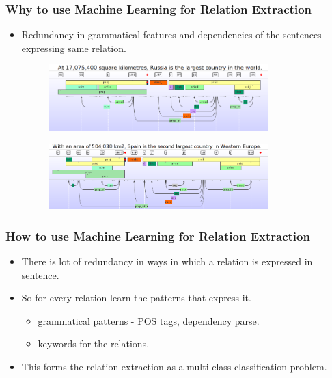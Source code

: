 \documentclass{beamer}
\begin{document}
\begin{frame}
 \frametitle{Why to use Machine Learning for Relation Extraction}
 
 \begin{itemize}
  \item Redundancy in grammatical features and dependencies of the sentences expressing same relation. \pause
     \begin{figure}
    \centering
    \includegraphics[width = 0.8\textwidth]{images/ex_4}
  \end{figure} \pause
  
   \begin{figure}
    \centering
    \includegraphics[width = 0.8\textwidth]{images/ex_5}
  \end{figure}
  
  
 \end{itemize}

\end{frame}

\begin{frame}
\frametitle{How to use Machine Learning for Relation Extraction}
\begin{itemize}
  \item There is lot of redundancy in ways in which a relation is expressed in sentence. \pause
  \item So for every relation learn the patterns that express it. \pause
    \begin{itemize}
      \item grammatical patterns - POS tags, dependency parse. \pause
      \item keywords for the relations. \pause
    \end{itemize}
    
    \item This forms the relation extraction as a multi-class classification problem.
 \end{itemize}
\end{frame}
\end{document}
